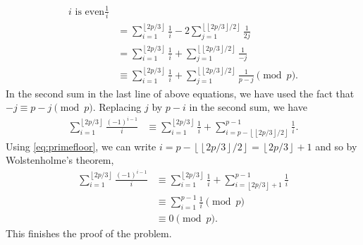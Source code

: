 \documentclass{subfile}
\begin{document}
\begin{solution}
\begin{align*}
{{				i\text{ is even}}}\frac {1}{i}\\
		&= \sum_{i = 1}^{\left\lfloor 2p/3\right\rfloor}\frac {1}{i} - 2\sum_{j = 1}^{\left\lfloor \left\lfloor 2p/3\right\rfloor /2\right\rfloor}\frac {1}{2j} \\
		&= \sum_{i = 1}^{\left\lfloor 2p/3\right\rfloor}\frac {1}{i} + \sum_{j = 1}^{\left\lfloor \left\lfloor 2p/3\right\rfloor /2\right\rfloor}\frac {1}{ - j}\\
		&\equiv\sum_{i = 1}^{\left\lfloor 2p/3\right\rfloor}\frac {1}{i} + \sum_{j = 1}^{\left\lfloor \left\lfloor 2p/3\right\rfloor /2\right\rfloor}\frac {1}{p - j} \pmod p.
		\end{align*}
		In the second sum in the last line of above equations, we have used the fact that $-j \equiv p-j \pmod p$. Replacing $ j$ by $ p - i$ in the second sum, we have
		\begin{align*}
		\sum_{i = 1}^{\left\lfloor 2p/3\right\rfloor}\frac {\left( - 1\right)^{i - 1}}{i} &\equiv \sum_{i = 1}^{\left\lfloor 2p/3\right\rfloor}\frac {1}{i} + \sum_{i = p - \left\lfloor \left\lfloor 2p/3\right\rfloor /2\right\rfloor}^{p - 1}\frac {1}{i}.
		\end{align*}
		Using \eqref{eq:primefloor}, we can write $i = p - \left\lfloor \left\lfloor 2p/3\right\rfloor /2\right\rfloor = \left\lfloor 2p/3\right\rfloor + 1$ and so by Wolstenholme's theorem,
		\begin{align*}
		\sum_{i = 1}^{\left\lfloor 2p/3\right\rfloor}\frac {\left( - 1\right)^{i - 1}}{i}  &\equiv \sum_{i = 1}^{\left\lfloor 2p/3\right\rfloor}\frac {1}{i} + \sum_{i = \left\lfloor 2p/3\right\rfloor + 1}^{p - 1}\frac {1}{i}\\
		&\equiv \sum_{i = 1}^{p - 1}\frac {1}{i}\pmod p\\
		&\equiv 0 \pmod p.
		\end{align*}
		This finishes the proof of the problem.
	\end{solution}	
\end{document}
